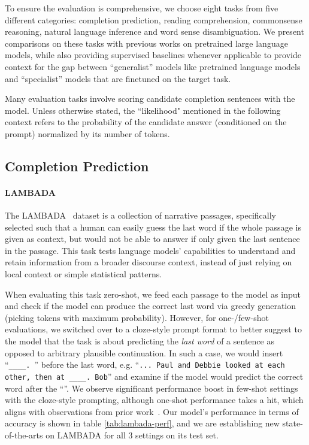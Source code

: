 \documentclass[11pt]{article}
\begin{document}
To ensure the evaluation is comprehensive, we choose eight tasks from five different categories: completion prediction, reading comprehension, commonsense reasoning, natural language inference and word sense disambiguation. We present comparisons on these tasks with previous works on pretrained large language models, while also providing supervised baselines whenever applicable to provide context for the gap between ``generalist'' models like pretrained language models and ``specialist'' models that are finetuned on the target task.

Many evaluation tasks involve scoring candidate completion sentences with the model. Unless otherwise stated, the ``likelihood" mentioned in the following context refers to the probability of the candidate answer (conditioned on the prompt) normalized by its number of tokens.

\subsection{Completion Prediction}

\paragraph{LAMBADA} The LAMBADA~\citep{paperno-etal-2016-lambada} dataset is a collection of narrative passages, specifically selected such that a human can easily guess the last word if the whole passage is given as context, but would not be able to answer if only given the last sentence in the passage. This task tests language models' capabilities to understand and retain information from a broader discourse context, instead of just relying on local context or simple statistical patterns.

When evaluating this task zero-shot, we feed each passage to the model as input and check if the model can produce the correct last word via greedy generation (picking tokens with maximum probability). However, for one-/few-shot evaluations, we switched over to a cloze-style prompt format to better suggest to the model that the task is about predicting the \emph{last word} of a sentence as opposed to arbitrary plausible continuation. In such a case, we would insert ``\texttt{\_\_\_\_.  }'' before the last word, e.g. ``\texttt{... Paul and Debbie looked at each other, then at \_\_\_\_.  Bob}'' and examine if the model would predict the correct word after the ``''. We observe significant performance boost in few-shot settings with the cloze-style prompting, although one-shot performance takes a hit, which aligns with observations from prior work~\citep{brown2020language}. Our model's performance in terms of accuracy is shown in table \ref{tab:lambada-perf}, and we are establishing new state-of-the-arts on LAMBADA for all 3 settings on its test set.
\end{document}
